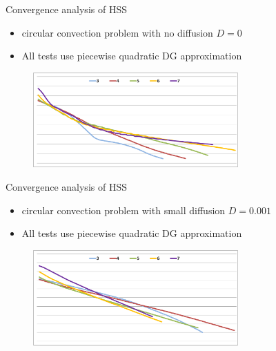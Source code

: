 \documentclass[mathserif]{beamer}
\begin{document}
\begin{frame}

{\large Convergence analysis of HSS}
\begin{itemize}
\item circular convection problem with no diffusion $D=0$
\item \vspace{-2mm}All tests use piecewise quadratic DG approximation
\end{itemize}
\begin{figure}
\centering
\includegraphics[width=0.7\textwidth]{resultGraphs/circularConvection/p2D0_new.png}
\end{figure}
\end{frame}

\begin{frame}

{\large Convergence analysis of HSS}
\begin{itemize}
\item circular convection problem with small diffusion $D=0.001$
\item \vspace{-2mm}All tests use piecewise quadratic DG approximation
\end{itemize}
\begin{figure}
\centering
\includegraphics[width=0.7\textwidth]{resultGraphs/circularConvection/p2D1e-3_new.png}
\end{figure}
\end{frame}
\end{document}
